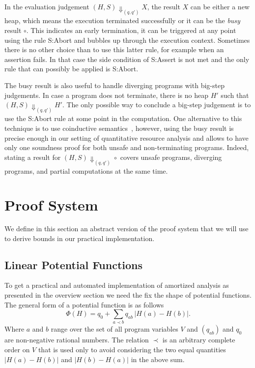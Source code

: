 \documentclass[10pt]{article}
\begin{document}
In the evaluation judgement $(H, S) \Downarrow_{(q, q')} X$, the result $X$ can
be either a new heap, which means the execution terminated successfully
or it can be the \emph{busy} result $\circ$.  This indicates an early
termination, it can be triggered at any point using the rule {\sc S:Abort}
and bubbles up through the execution context.
Sometimes there is no other choice than to use this latter rule, for
example when an assertion fails.  In that case the side condition of
{\sc S:Assert} is not met and the only rule that can possibly be applied
is {\sc S:Abort}.

The busy result is also useful to handle diverging programs with big-step
judgements.  In case a program does not terminate, there is no heap $H'$
such that $(H, S)\Downarrow_{(q, q')} H'$.  The only possible way to
conclude a big-step judgement is to use the {\sc S:Abort} rule at some
point in the computation.  One alternative to this technique is to use
coinductive semantics~\cite{Leroy-coind}, however, using the busy
result is precise enough in our setting of quantitative resource analysis and
allows to have only one soundness proof for both unsafe and
non-terminating programs.  Indeed, stating a result for
$(H, S) \Downarrow_{(q,q')} \circ$ covers unsafe programs, diverging
programs, and partial computations at the same time.


\section{Proof System}

We define in this section an abstract version of the proof system that
we will use to derive bounds in our practical implementation.

\subsection{Linear Potential Functions}

To get a practical and automated implementation of amortized analysis
as presented in the overview section we need the fix the shape of
potential functions.  The general form of a potential function is as follows
$$
\Phi(H) = q_0 + \sum_{a \prec b} q_{ab}\,|H(a) - H(b)|.
$$
Where $a$ and $b$ range over the set of all program variables $V$ and
$(q_{ab})$ and $q_0$ are non-negative rational numbers.  The relation
$\prec$ is an arbitrary complete order on $V$ that is used only to
avoid considering the two equal quantities $|H(a) - H(b)|$ and
$|H(b) - H(a)|$ in the above sum.
\end{document}
